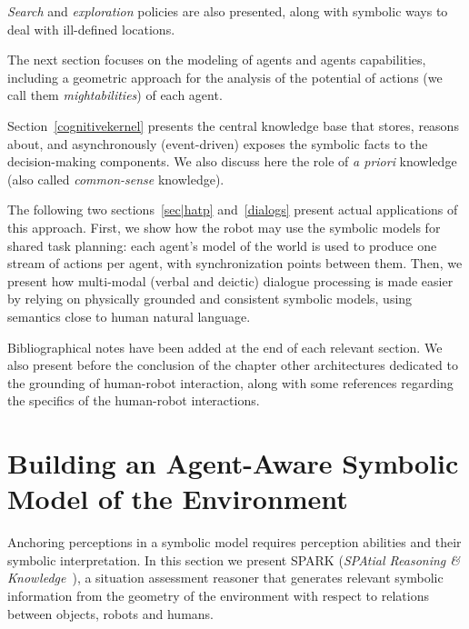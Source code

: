 \documentclass{svmult}
\begin{document}
\emph{Search} and \emph{exploration} policies are also presented, along with
symbolic ways to deal with ill-defined locations.

The next section focuses on the modeling of agents and agents capabilities,
including a geometric approach for the analysis of the potential of actions (we
call them \emph{mightabilities}) of each agent.

Section~\ref{cognitivekernel} presents the central knowledge base that
stores, reasons about, and asynchronously (event-driven) exposes the symbolic
facts to the decision-making components. We also discuss here the role of {\it
a priori} knowledge (also called \emph{common-sense} knowledge).

The following two sections~\ref{sec|hatp} and~\ref{dialogs} present actual
applications of this approach. First, we show how the robot may use the
symbolic models for shared task planning: each agent's model of the world is
used to produce one stream of actions per agent, with synchronization points
between them. Then, we present how multi-modal (verbal and deictic) dialogue
processing is made easier by relying on physically grounded and consistent
symbolic models, using semantics close to human natural language.

Bibliographical notes have been added at the end of each relevant section.  We
also present before the conclusion of the chapter other architectures dedicated
to the grounding of human-robot interaction, along with some references
regarding the specifics of the human-robot interactions.



\section{Building an Agent-Aware Symbolic Model of the Environment}
\label{sec:situ}

Anchoring perceptions in a symbolic model requires perception abilities and
their symbolic interpretation. In this section we present SPARK (\emph{SPAtial
Reasoning \& Knowledge}~\cite{Sisbot2011}), a situation assessment reasoner
that generates relevant symbolic information from the geometry of the
environment with respect to relations between objects, robots and humans.
\end{document}
